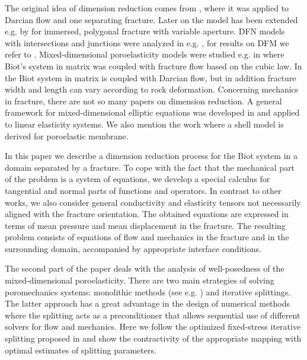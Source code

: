 \documentclass[a4paper]{m2an}
\numberwithin{equation}{section}
\begin{document}
The original idea of dimension reduction comes from \cite{martin_modeling_2005}, where it was applied to Darcian flow and one separating fracture.
Later on the model has been extended e.g. by \cite{angot2009asymptotic} for immersed, polygonal fracture with variable aperture.
DFN models with intersections and junctions were analyzed in e.g. \cite{maryska2005numerical,pichot2012generalized,formaggia2014reduced}, for results on DFM we refer to \cite{schwenck2015dimensionally}.
% 
Mixed-dimensional poroelasticity models were studied e.g. in \cite{ganis2014modeling} where Biot's system in matrix was coupled with fracture flow based on the cubic law.
In \cite{hanowski2018hydromechanical} the Biot system in matrix is coupled with Darcian flow, but in addition fracture width and length can vary according to rock deformation.
Concerning mechanics in fracture, there are not so many papers on dimension reduction.
A general framework for mixed-dimensional elliptic equations was developed in \cite{boon2017functional,boon2019stable} and applied to linear elasticity systems.
We also mention the work \cite{mikelic2019derivation} where a shell model is derived for poroelastic membrane.

In this paper we describe a dimension reduction process for the Biot system in a domain separated by a fracture.
To cope with the fact that the mechanical part of the problem is a system of equations, we develop a special calculus for tangential and normal parts of functions and operators.
In contrast to other works, we also consider general conductivity and elasticity tensors not necessarily aligned with the fracture orientation.
The obtained equations are expressed in terms of mean pressure and mean displacement in the fracture.
The resulting problem consists of equations of flow and mechanics in the fracture and in the surrounding domain, accompanied by appropriate interface conditions.

The second part of the paper deals with the analysis of well-posedness of the mixed-dimensional poroelasticity.
There are two main strategies of solving poromechanics systems: monolithic methods (see e.g. \cite{showalter2000diffusion,zenisek1984existence}) and iterative splittings.
The latter approach has a great advantage in the design of numerical methods where the splitting acts as a preconditioner \cite{white2016block} that allows sequential use of different solvers for flow and mechanics.
Here we follow the optimized fixed-stress iterative splitting proposed in \cite{mikelic2013convergence} and show the contractivity of the appropriate mapping with optimal estimates of splitting parameters.
\end{document}
